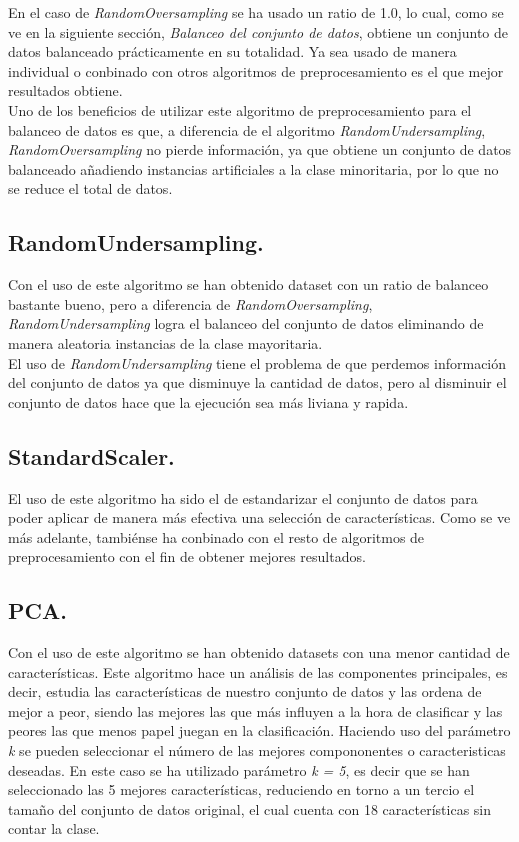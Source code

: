 \documentclass[11pt]{article}
\begin{document}
En el caso de \textit{RandomOversampling} se ha usado un ratio de 1.0, lo cual, como se ve en la siguiente sección, \textit{Balanceo del conjunto de datos}, obtiene un conjunto de datos balanceado prácticamente en su totalidad. Ya sea usado de manera individual o conbinado con otros algoritmos de preprocesamiento es el que mejor resultados obtiene.\\

Uno de los beneficios de utilizar este algoritmo de preprocesamiento para el balanceo de datos es que, a diferencia de el algoritmo \textit{RandomUndersampling}, \textit{RandomOversampling} no pierde información, ya que obtiene un conjunto de datos balanceado añadiendo instancias artificiales a la clase minoritaria, por lo que no se reduce el total de datos.

\subsection{RandomUndersampling.}

Con el uso de este algoritmo se han obtenido dataset con un ratio de balanceo bastante bueno, pero a diferencia de \textit{RandomOversampling}, \textit{RandomUndersampling} logra el balanceo del  conjunto de datos eliminando de manera aleatoria instancias de la clase mayoritaria.\\

El uso de \textit{RandomUndersampling} tiene el problema de que perdemos información del conjunto de datos ya que disminuye la cantidad de datos, pero al disminuir el conjunto de datos hace que la ejecución sea más liviana y rapida.


\subsection{StandardScaler.}

El uso de este algoritmo ha sido el de estandarizar el conjunto de datos para poder aplicar de manera más efectiva una selección de características. Como se ve más adelante, tambiénse ha conbinado con el resto de algoritmos de preprocesamiento con el fin de obtener mejores resultados.

\subsection{PCA.}

Con el uso de este algoritmo se han obtenido datasets con una menor cantidad de características. Este algoritmo hace un análisis de las componentes principales, es decir, estudia las características de nuestro conjunto de datos y las ordena de mejor a peor, siendo las mejores las que más influyen a la hora de clasificar y las peores las que menos papel juegan en la clasificación. Haciendo uso del parámetro \textit{k} se pueden seleccionar el número de las mejores compononentes o caracteristicas deseadas. En este caso se ha utilizado parámetro \textit{k = 5}, es decir que se han seleccionado las 5 mejores características, reduciendo en torno a un tercio el tamaño del conjunto de datos original, el cual cuenta con 18 características sin contar la clase.
\end{document}
